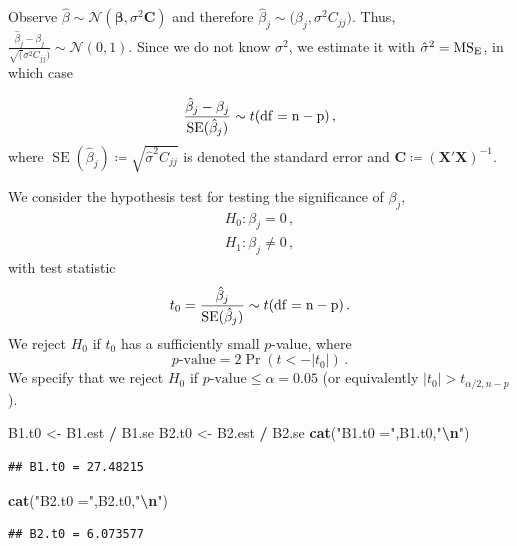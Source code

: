 \documentclass[
]{article}
\newenvironment{Shaded}{\begin{snugshade}}{\end{snugshade}}
\newcommand{\FunctionTok}[1]{\textcolor[rgb]{0.13,0.29,0.53}{\textbf{#1}}}
\newcommand{\NormalTok}[1]{#1}
\newcommand{\OtherTok}[1]{\textcolor[rgb]{0.56,0.35,0.01}{#1}}
\newcommand{\SpecialCharTok}[1]{\textcolor[rgb]{0.81,0.36,0.00}{\textbf{#1}}}
\newcommand{\StringTok}[1]{\textcolor[rgb]{0.31,0.60,0.02}{#1}}
\begin{document}
Observe
\(\hat\beta \sim \mathcal{N}(\mathbf{\beta}, \sigma^2 \mathbf{C})\) and
therefore \(\hat\beta_j \sim \mathcal(\beta_j, \sigma^2 C_{j j})\).
Thus,
\(\frac{\hat\beta_j - \beta_j}{\sqrt(\sigma^2 C_{j j})} \sim \mathcal{N}(0,1)\).
Since we do not know \(\sigma^2\), we estimate it with
\(\hat\sigma^2 = \rm{MS_E}\), in which case

\[
   \frac{\hat\beta_j - \beta_j}{\operatorname{SE}(\hat\beta_j)} \sim t(\rm{df} = n-p)\,,
\] where
\(\operatorname{SE}(\hat\beta_j) \coloneqq \sqrt{\hat\sigma^2 C_{j j}}\)
is denoted the standard error and
\(\mathbf{C} \coloneqq (\mathbf{X}' \mathbf{X})^{-1}\).

We consider the hypothesis test for testing the significance of
\(\beta_j\), \begin{align*}
  H_0 : \beta_j = 0\,,\\
  H_1 : \beta_j \neq 0\,,
\end{align*} with test statistic \[
    t_0 = \frac{\hat\beta_j}{\operatorname{SE}(\hat\beta_j)} \sim t(\rm{df}=n-p)\,.
\] We reject \(H_0\) if \(t_0\) has a sufficiently small \(p\)-value,
where \[
   \text{$p$-value} = 2 \Pr(t < -|t_0|)\,.
\] We specify that we reject \(H_0\) if
\(p\text{-value} \leq \alpha = 0.05\) (or equivalently
\(|t_0| > t_{\alpha/2,n-p}\)).

\begin{Shaded}
\begin{Highlighting}[]
\NormalTok{B1.t0 }\OtherTok{\textless{}{-}}\NormalTok{ B1.est }\SpecialCharTok{/}\NormalTok{ B1.se}
\NormalTok{B2.t0 }\OtherTok{\textless{}{-}}\NormalTok{ B2.est }\SpecialCharTok{/}\NormalTok{ B2.se}
\FunctionTok{cat}\NormalTok{(}\StringTok{"B1.t0 ="}\NormalTok{,B1.t0,}\StringTok{"}\SpecialCharTok{\textbackslash{}n}\StringTok{"}\NormalTok{)}
\end{Highlighting}
\end{Shaded}

\begin{verbatim}
## B1.t0 = 27.48215
\end{verbatim}

\begin{Shaded}
\begin{Highlighting}[]
\FunctionTok{cat}\NormalTok{(}\StringTok{"B2.t0 ="}\NormalTok{,B2.t0,}\StringTok{"}\SpecialCharTok{\textbackslash{}n}\StringTok{"}\NormalTok{)}
\end{Highlighting}
\end{Shaded}

\begin{verbatim}
## B2.t0 = 6.073577
\end{verbatim}
\end{document}
